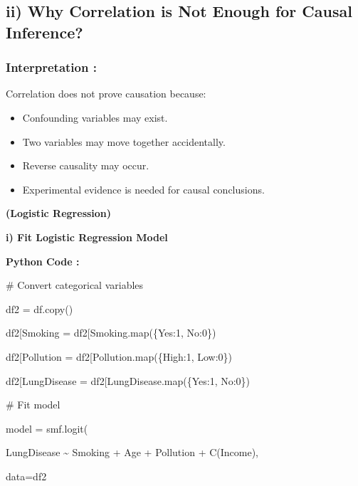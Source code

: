 \documentclass[
]{article}
\begin{document}
\subsection{\texorpdfstring{\textbf{ii) Why Correlation is Not Enough
for Causal
Inference?}}{ii) Why Correlation is Not Enough for Causal Inference?}}\label{ii-why-correlation-is-not-enough-for-causal-inference}

\subsubsection{Interpretation :}\label{interpretation-1}

Correlation does not prove causation because:

\begin{itemize}
\item
  Confounding variables may exist.
\item
  Two variables may move together accidentally.
\item
  Reverse causality may occur.
\item
  Experimental evidence is needed for causal conclusions.
\end{itemize}

\textbf{(Logistic Regression)}

\textbf{i) Fit Logistic Regression Model}

\textbf{Python Code :}

\# Convert categorical variables

df2 = df.copy()

df2{[}\textquotesingle Smoking\textquotesingle{]} =
df2{[}\textquotesingle Smoking\textquotesingle{]}.map(\{\textquotesingle Yes\textquotesingle:1,
\textquotesingle No\textquotesingle:0\})

df2{[}\textquotesingle Pollution\textquotesingle{]} =
df2{[}\textquotesingle Pollution\textquotesingle{]}.map(\{\textquotesingle High\textquotesingle:1,
\textquotesingle Low\textquotesingle:0\})

df2{[}\textquotesingle LungDisease\textquotesingle{]} =
df2{[}\textquotesingle LungDisease\textquotesingle{]}.map(\{\textquotesingle Yes\textquotesingle:1,
\textquotesingle No\textquotesingle:0\})

\# Fit model

model = smf.logit(

\textquotesingle LungDisease \textasciitilde{} Smoking + Age + Pollution
+ C(Income)\textquotesingle,

data=df2
\end{document}
